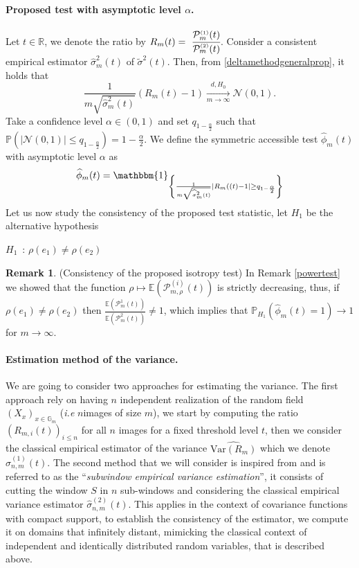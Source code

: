 \documentclass[12pt]{article}
\renewcommand{\tilde}{\widetilde}
\renewcommand{\hat}{\widehat}
\theoremstyle{Theorem}
\theoremstyle{definition}
\newtheorem{remark}{Remark}
\begin{document}
\paragraph{Proposed test with asymptotic level $\alpha$.} Let $t \in \mathbb{R}$,  we denote the ratio by $R_{m}(t) =~\cfrac{\mathcal{P}^{\scriptscriptstyle  (1) }_{m}(t)}{\mathcal{P}^{\scriptscriptstyle  (2) }_{m}(t)}$.
Consider a consistent empirical estimator $\hat{\sigma}^{2}_{m}(t)$ of $\tilde{\sigma}^{2}(t)$. Then, from \ref{deltamethodgeneralprop}, it holds that 
$$ \frac{1}{m\sqrt{\hat{\sigma}^{2}_{m}(t)}}\left(R_{m}(t) - 1 \right)  \xrightarrow[m \to \infty]{d, H_{0}} \mathcal{N}\left(0, 1 \right).$$
Take a confidence level $\alpha \in (0,1)$ and set $q_{1-\frac{\alpha}{2}}$ such that $\mathbb{P}\left(|\mathcal{N}\left(0,1\right)| \leq  q_{1-\frac{\alpha}{2}} \right) = 1 - \frac{\alpha}{2}$. We define the symmetric accessible test $\hat{\phi}_{m}(t)$ with asymptotic level $\alpha$ as 
\begin{equation}
\label{phihat}
\hat{\phi}_{m}(t)= \mathbbm{1}_{\left\{ \frac{1}{m\sqrt{\hat{\sigma}^{2}_{m}(t)}}\left|R_{m}((t) - 1 \right| \geq q_{1- \frac{\alpha}{2}} \right\}}
\end{equation}
Let us now study the consistency of the proposed test statistic, let $H_{1}$ be the alternative hypothesis
\begin{center}
$H_{1}$\, :\; $\rho(e_1) \neq \rho(e_2)$
\end{center} 
\begin{remark}(Consistency of the proposed isotropy test) In Remark \ref{powertest} we showed that the function $\rho \mapsto \mathbb{E}\left(\mathcal{P}^{\scriptscriptstyle (i)}_{m, \rho}(t)\right)$ is strictly decreasing, thus, if $\rho(e_1) \neq \rho(e_2)$ then $\frac{\mathbb{E}\left(\mathcal{P}^{1}_{m}(t)\right)}{\mathbb{E}\left(\mathcal{P}_{m}^{2}(t)\right)} \neq 1$, which implies that $\mathbb{P}_{H_{1}}\left(\hat{\phi}_{m}(t) = 1\right) \to 1$ for $m\to \infty$. 
\end{remark}
\paragraph{Estimation method of the variance.} We are going to consider two approaches for estimating the variance. The first approach rely on having $n$ independent realization of the random field $(X_{x})_{x \in \mathbb{G}_{m}}$  (\textit{i.e} $n$images of size $m$), we start by computing the ratio $(R_{m, i}(t))_{i \leq n}$ for all $n$ images for a fixed threshold level $t$, then we consider the classical empirical estimator of the variance $\hat{\text{Var}(R_{m})}$ which we denote $\hat{\sigma}^{\scriptscriptstyle (1)}_{n, m}(t)$. The second method that we will consider is inspired from \cite{ElenaCeline2020} and is referred to as the ``\textit{subwindow empirical variance estimation}'', it consists of cutting the window $S$ in $n$ sub-windows and considering the classical empirical variance estimator $\hat{\sigma}^{\scriptscriptstyle (2)}_{n, m}(t)$. This applies in the context of covariance functions with compact support, to establish the consistency of the estimator, we compute it on domains that infinitely distant, mimicking the classical context of independent and identically distributed random variables, that is described above.
\end{document}
